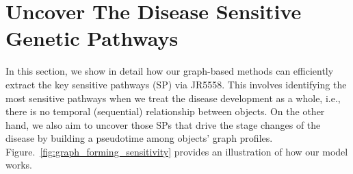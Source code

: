 \documentclass{article} %
\begin{document}





\section{Uncover The Disease Sensitive Genetic Pathways}
In this section, we show in detail how our graph-based methods can efficiently extract the key sensitive pathways (SP) via JR5558. This involves identifying the most sensitive pathways when we treat the disease development as a whole, i.e., there is no temporal (sequential)
relationship between objects. On the other hand, we also aim to uncover those SPs that drive the stage changes of the disease by building a pseudotime among objects' graph profiles. 
Figure.~\ref{fig:graph_forming_sensitivity} provides an illustration of how our model works.
\end{document}
